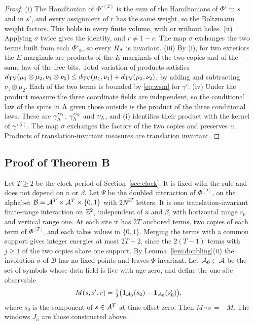 \begin{proof}
(i) The Hamiltonian of \(\Phi'^{(2)}\) is the sum of the Hamiltonians of \(\Phi'\) in \(s\) and in \(s'\), and every assignment of \(r\) has the same weight, so the Boltzmann weight factors. This holds in every finite volume, with or without holes. (ii) Applying \(\sigma\) twice gives the identity, and \(r\ne1-r\). The map \(\sigma\) exchanges the two terms built from each \(\Phi'_\alpha\), so every \(H_\Lambda\) is invariant. (iii) By (i), for two exteriors the \(E\)-marginals are products of the \(E\)-marginals of the two copies and of the same law of the free bits. Total variation of products satisfies \(d_{\mathrm{TV}}(\mu_1\otimes\mu_2,\nu_1\otimes\nu_2)\le d_{\mathrm{TV}}(\mu_1,\nu_1)+d_{\mathrm{TV}}(\mu_2,\nu_2)\), by adding and subtracting \(\nu_1\otimes\mu_2\). Each of the two terms is bounded by \eqref{eq:wsm} for \(\gamma'\). (iv) Under the product measure the three coordinate fields are independent, so the conditional law of the spins in \(\Lambda\) given those outside is the product of the three conditional laws. These are \(\gamma'^{\tau_1}_\Lambda\), \(\gamma'^{\tau_2}_\Lambda\) and \(\upsilon_\Lambda\), and (i) identifies their product with the kernel of \(\gamma^{(2)}\). The map \(\sigma\) exchanges the factors of the two copies and preserves \(\upsilon\). Products of translation-invariant measures are translation invariant.
\end{proof}

\subsection{Proof of Theorem B}\label{sec:proofB}

Let \(T\ge2\) be the clock period of Section~\ref{sec:clock}. It is fixed with the rule and does not depend on \(n\) or \(\beta\). Let \(\Psi\) be the doubled interaction of \(\Phi^{[T]}\), on the alphabet \(\mathcal B=\mathcal A^T\times\mathcal A^T\times\{0,1\}\) with \(2N^{2T}\) letters. It is one translation-invariant finite-range interaction on \(\mathbb Z^2\), independent of \(n\) and \(\beta\), with horizontal range \(r_0\) and vertical range one. At each site it has \(2T\) anchored terms, two copies of each term of \(\Phi^{[T]}\), and each takes values in \(\{0,1\}\). Merging the terms with a common support gives integer energies at most \(2T-2\), since the \(2(T-1)\) terms with \(j\ge1\) of the two copies share one support. By Lemma~\ref{lem:doubling}(ii) the involution \(\sigma\) of \(\mathcal B\) has no fixed points and leaves \(\Psi\) invariant. Let \(\mathcal A_0\subset\mathcal A\) be the set of symbols whose data field is live with age zero, and define the one-site observable
\[
M(s,s',r)=\tfrac12\bigl(\mathbf 1_{\mathcal A_0}(s_0)-\mathbf 1_{\mathcal A_0}(s'_0)\bigr),
\]
where \(s_0\) is the component of \(s\in\mathcal A^T\) at time offset zero. Then \(M\circ\sigma=-M\). The windows \(J_n\) are those constructed above.

